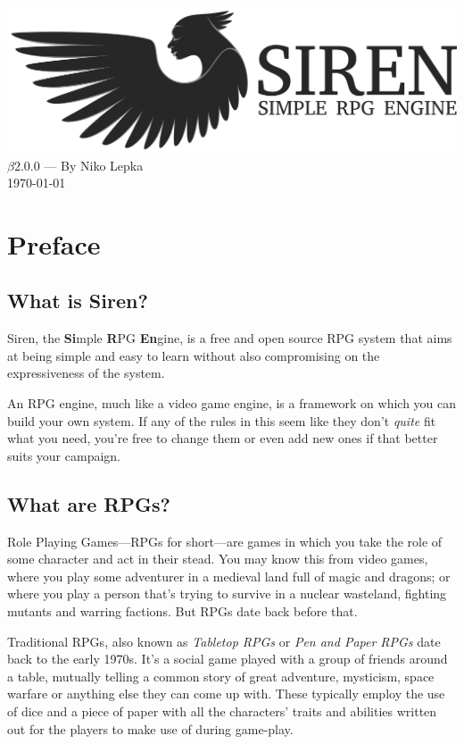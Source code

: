 \documentclass[a4paper]{book}
\begin{document}
\begin{titlepage}
\begin{center}
  \includegraphics[width = \textwidth]{graphics/svg-logo.png}
  \LARGE{$\beta2.0.0$ --- By Niko Lepka}\\
  \Large{\today}
\end{center}
\end{titlepage}
\thispagestyle{empty} %
\frontmatter %
\chapter*{Preface}
\section*{What is Siren?}
Siren, the \textbf{Si}mple \textbf{R}PG \textbf{En}gine, is a free and open source RPG system that aims at being simple and easy to learn without also compromising on the expressiveness of the system.

An RPG engine, much like a video game engine, is a framework on which you can build your own system. If any of the rules in this seem like they don't \textit{quite} fit what you need, you're free to change them or even add new ones if that better suits your campaign.

\section*{What are RPGs?}
Role Playing Games---RPGs for short---are games in which you take the role of some character and act in their stead.
You may know this from video games, where you play some adventurer in a medieval land full of magic and dragons; or where you play a person that's trying to survive in a nuclear wasteland, fighting mutants and warring factions.
But RPGs date back before that.

Traditional RPGs, also known as \textit{Tabletop RPGs} or \textit{Pen and Paper RPGs} date back to the early 1970s.
It's a social game played with a group of friends around a table, mutually telling a common story of great adventure, mysticism, space warfare or anything else they can come up with.
These typically employ the use of dice and a piece of paper with all the characters' traits and abilities written out for the players to make use of during game-play.
\end{document}
